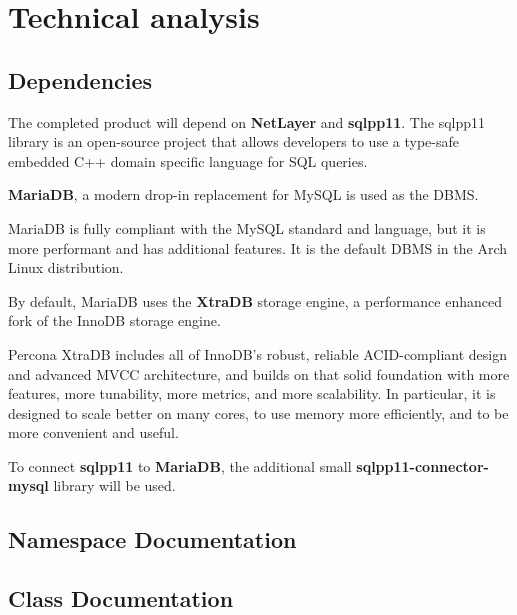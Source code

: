 \documentclass[12pt]{report}
\newcommand{\+}{\discretionary{\mbox{\scriptsize$\hookleftarrow$}}{}{}}
\renewcommand\emph{\textbf}
\begin{document}
    \chapter{Technical analysis}

        \section{Dependencies}

            The completed product will depend on \emph{NetLayer} and \emph{sqlpp11}. The sqlpp11 library is an open-source project that allows developers to use a type-safe embedded C++ domain specific language for SQL queries.

            \emph{MariaDB}, a modern drop-in replacement for MySQL is used as the DBMS. 

            MariaDB is fully compliant with the MySQL standard and language, but it is more performant and has additional features. It is the default DBMS in the Arch Linux distribution.

            By default, MariaDB uses the \emph{XtraDB} storage engine, a performance enhanced fork of the InnoDB storage engine.

            Percona XtraDB includes all of InnoDB's robust, reliable ACID-compliant design and advanced MVCC architecture, and builds on that solid foundation with more features, more tunability, more metrics, and more scalability. In particular, it is designed to scale better on many cores, to use memory more efficiently, and to be more convenient and useful. 

            To connect \emph{sqlpp11} to \emph{MariaDB}, the additional small \emph{sqlpp11-connector-mysql} library will be used.
        
        \section{Namespace Documentation}
            
            
            
            
            

        \section{Class Documentation}
            
            
            
\end{document}
